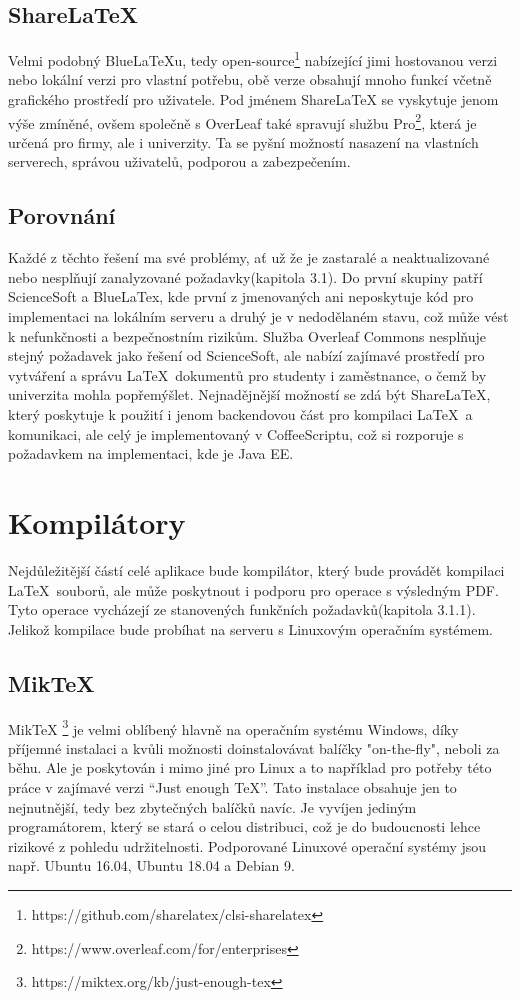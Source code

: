 \subsection{ShareLaTeX}
Velmi podobný BlueLaTeXu, tedy open-source\footnote{https://github.com/sharelatex/clsi-sharelatex} nabízející jimi hostovanou verzi nebo lokální verzi pro vlastní potřebu, obě verze obsahují mnoho funkcí včetně grafického prostředí pro uživatele. Pod jménem ShareLaTeX se vyskytuje jenom výše zmíněné, ovšem společně s OverLeaf také spravují službu Pro\footnote{https://www.overleaf.com/for/enterprises}, která je určená pro firmy, ale i univerzity. Ta se pyšní možností nasazení na vlastních serverech, správou uživatelů, podporou a zabezpečením.

\subsection{Porovnání}
Každé z těchto řešení ma své problémy, ať už že je zastaralé a neaktualizované nebo nesplňují zanalyzované požadavky(kapitola 3.1). Do první skupiny patří ScienceSoft a BlueLaTex, kde první z jmenovaných ani neposkytuje kód pro implementaci na lokálním serveru a druhý je v nedodělaném stavu, což může vést k nefunkčnosti a bezpečnostním rizikům. Služba Overleaf Commons nesplňuje stejný požadavek jako řešení od ScienceSoft, ale nabízí zajímavé prostředí pro vytváření a správu \LaTeX\ dokumentů pro studenty i zaměstnance, o čemž by univerzita mohla popřemýšlet. Nejnadějnější možností se zdá být ShareLaTeX, který poskytuje k použití i jenom backendovou část pro kompilaci \LaTeX\ a komunikaci, ale celý je implementovaný v CoffeeScriptu, což si rozporuje s požadavkem na implementaci, kde je Java EE. 

\section{Kompilátory}
Nejdůležitější částí celé aplikace bude kompilátor, který bude provádět kompilaci \LaTeX\ souborů, ale může poskytnout i podporu pro operace s výsledným PDF. Tyto operace vycházejí ze stanovených funkčních požadavků(kapitola 3.1.1). Jelikož kompilace bude probíhat na serveru s Linuxovým operačním systémem.

\subsection{MikTeX}
MikTeX \footnote{https://miktex.org/kb/just-enough-tex} je velmi oblíbený hlavně na operačním systému Windows, díky příjemné instalaci a kvůli možnosti doinstalovávat balíčky "on-the-fly", neboli za běhu. Ale je poskytován i mimo jiné pro Linux a to například pro potřeby této práce v zajímavé verzi “Just enough TeX”. Tato instalace obsahuje jen to nejnutnější, tedy bez zbytečných balíčků navíc. Je vyvíjen jediným programátorem, který se stará o celou distribuci, což je do budoucnosti lehce rizikové z pohledu udržitelnosti. Podporované Linuxové operační systémy jsou např. Ubuntu 16.04, Ubuntu 18.04 a Debian 9.

